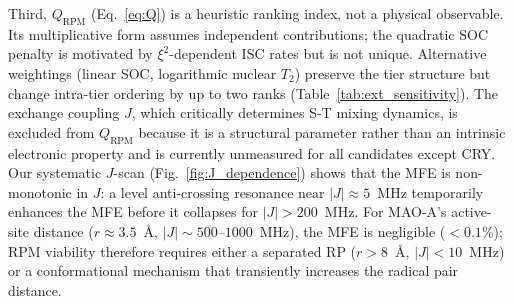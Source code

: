 \documentclass[11pt]{article}
\begin{document}
Third, $Q_\mathrm{RPM}$ (Eq.~\ref{eq:Q}) is a heuristic ranking index, not a physical observable. Its multiplicative form assumes independent contributions; the quadratic SOC penalty is motivated by $\xi^2$-dependent ISC rates\cite{Marian2012} but is not unique. Alternative weightings (linear SOC, logarithmic nuclear $T_2$) preserve the tier structure but change intra-tier ordering by up to two ranks (Table~\ref{tab:ext_sensitivity}). The exchange coupling $J$, which critically determines S-T mixing dynamics, is excluded from $Q_\mathrm{RPM}$ because it is a structural parameter rather than an intrinsic electronic property and is currently unmeasured for all candidates except CRY. Our systematic $J$-scan (Fig.~\ref{fig:J_dependence}) shows that the MFE is non-monotonic in $J$: a level anti-crossing resonance near $|J| \approx 5$~MHz temporarily enhances the MFE before it collapses for $|J| > 200$~MHz. For MAO-A's active-site distance ($r \approx 3.5$~\AA, $|J| \sim 500$--$1000$~MHz), the MFE is negligible ($<0.1\%$); RPM viability therefore requires either a separated RP ($r > 8$~\AA, $|J| < 10$~MHz) or a conformational mechanism that transiently increases the radical pair distance.
\end{document}
